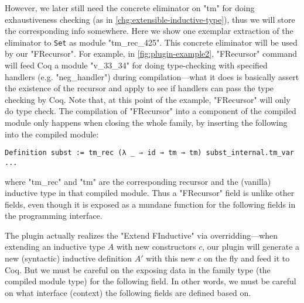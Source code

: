 However, we later still need the concrete eliminator on "tm" for doing exhaustiveness checking (as in \ref{chg:extensible-inductive-type}), thus we will store the corresponding info somewhere.  Here we show one exemplar extraction of the eliminator to \texttt{Set} as module "tm_rec_425". This concrete eliminator will be used by our "FRecursor". For example, in \cref{fig:plugin-example2}, "FRecursor" command will feed Coq a module "v_33_34" for doing type-checking with specified handlers (e.g. "neg_handler") during compilation---what it does is basically
assert the existence of the recursor and apply to see if handlers can
pass the type checking by Coq. Note that, at this point of the example, "FRecursor" will only do type check. The compilation of "FRecursor" into a component of the compiled module only happens when closing the whole family, by inserting the following into the compiled module: 
\begin{verbatim}
Definition subst := tm_rec (λ _ ⇒ id → tm → tm) subst_internal.tm_var ...
\end{verbatim}
where "tm_rec" and "tm" are the corresponding recursor and the (vanilla) inductive type in that compiled module. Thus a "FRecursor" field is unlike other fields, even though it is exposed as a mundane function for the following fields in the programming interface.

The plugin actually realizes the "Extend FInductive" via overridding---when extending an inductive type $A$
with new constructors $c$, our plugin will generate a new (syntactic) inductive definition $A'$ with this new $c$ on the fly and feed it to Coq. But we must be careful on the exposing data in the family type (the compiled module type) for the following field. In other words, we must be careful on what interface (context) the following fields are defined based on. 

